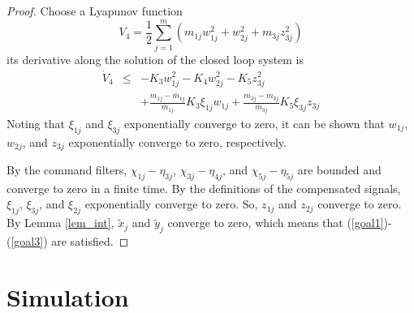\documentclass[letterpaper, 10 pt, conference]{ieeeconf}  %
\begin{document}
\begin{proof}
Choose a Lyapunov function
$$V_4=\frac{1}{2}\sum^m_{j=1}(m_{1j}w^2_{1j}+w^2_{2j}+m_{3j}z^2_{3j})$$
its derivative along the solution of the closed loop system is
\begin{eqnarray*}
\dot{V}_4%
&\leq &-K_3w^2_{1j}-K_4w^2_{2j}-K_5z^2_{3j}\\
&&+\frac{m_{1j}-\bar{m}_{1j}}{\bar{m}_{1j}}K_3\xi_{1j}w_{1j} +\frac{m_{3j}-\bar{m}_{3j}}{\bar{m}_{3j}}K_5{\xi}_{3j}z_{3j}
\end{eqnarray*}
Noting that $\xi_{1j}$ and $\xi_{3j}$ exponentially converge to zero, it can be shown that $w_{1j}$, $w_{2j}$, and $z_{3j}$ exponentially converge to zero, respectively. 

By the command filters,  $\chi_{1j}-\eta_{3j}$,  $\chi_{3j}-\eta_{4j}$, and $\chi_{5j}-\eta_{5j}$ are bounded and converge to zero in a finite time. By the definitions of the compensated signals, $\xi_{1j}$, $\xi_{3j}$, and $\xi_{2j}$ exponentially converge to zero. So, $z_{1j}$ and $z_{2j}$ converge to zero. By Lemma \ref{lem_int}, $\tilde{x}_j$ and $\tilde{y}_j$ converge to zero, which means that  (\ref{goal1})-(\ref{goal3}) are satisfied.
\end{proof}


\section{Simulation}
\label{sec5}
\end{document}
